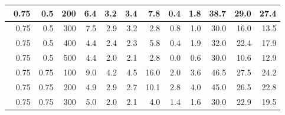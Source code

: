 \begin{longtable}{|r|r|r|r|r|r|r|r|r|r|r|r|}
    \hline \
    0.75                           & 0.5                     & 200                       & 6.4                       & 3.2                       & 3.4                       & 7.8                       & 0.4                       & 1.8                       & 38.7                      & 29.0                      & 27.4                      \\
    \hline \
    0.75                           & 0.5                     & 300                       & 7.5                       & 2.9                       & 3.2                       & 2.8                       & 0.8                       & 1.0                       & 30.0                      & 16.0                      & 13.5                      \\
    \hline \
    0.75                           & 0.5                    & 400                       & 4.4                       & 2.4                       & 2.3                       & 5.8                      & 0.4                       & 1.9                       & 32.0                      & 22.4                      & 17.9                      \\
    \hline \
    0.75                           & 0.5                    & 500                       & 4.4                       & 2.0                       & 2.1                       & 2.8                      & 0.0                       & 0.6                       & 30.0                      & 10.6                      & 12.9                      \\
    \hline \
    0.75                           & 0.75                    & 100                       & 9.0                       & 4.2                       & 4.5                       & 16.0                       & 2.0                       & 3.6                       & 46.5                      & 27.5                      & 24.2                      \\
    \hline \
    0.75                           & 0.75                    & 200                       & 4.9                       & 2.9                       & 2.7                       & 10.1                       & 2.8                       & 4.0                       & 45.0                      & 26.5                      & 22.8                      \\
    \hline \
    0.75                           & 0.75                    & 300                       & 5.0                       & 2.0                       & 2.1                       & 4.0                       & 1.4                       & 1.6                       & 30.0                      & 22.9                      & 19.5                      \\

\end{longtable}
